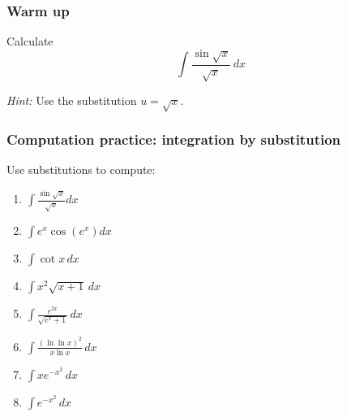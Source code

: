 \documentclass[14pt]{beamer}
\date{}
\title{}
\author{}
\begin{document}





	\begin{frame}[t]
		\frametitle{Warm up}

		Calculate
		\[
			\int \frac{\sin \sqrt{x}}{\sqrt{x}}\, dx
		\]

		\emph{Hint:} Use the substitution $\displaystyle u=\sqrt{x}$.
	\end{frame}


	\begin{frame}[t]
		\frametitle{Computation practice: integration by substitution}

		Use substitutions to compute:
		\begin{multicols}{2}
			\begin{enumerate}
				\item $\displaystyle \int \frac{\sin \sqrt{x}}{\sqrt{x}}dx$
					\vspace{.2cm}

				\item $\displaystyle \int e^{x}\cos \left(e^{x}\right) dx$
					\vspace{.2cm}

				\item $\displaystyle \int \cot x \, dx$
					\vspace{.2cm}

				\item $\displaystyle \int x^{2}\sqrt{x+1}\, dx$
					\vspace{.2cm}

				\item $\displaystyle \int \frac{e^{2x}}{\sqrt{e^{x}+ 1}}\, dx$
					\vspace{.2cm}

				\item $\displaystyle \int \frac{\left( \ln \ln x \right)^{2}}{ x \ln x}\,
					dx$
					\vspace{.2cm}

				\item $\displaystyle \int x e^{-x^2}\, dx$
					\vspace{.2cm}

				\item $\displaystyle \int e^{-x^2}\, dx$
					\vspace{.2cm}
			\end{enumerate}
		\end{multicols}
	\end{frame}
\end{document}
